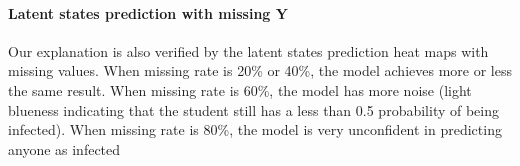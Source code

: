 \documentclass{article} %
\begin{document}
\begin{figure}[htpb]
\centering
{}
\end{figure}


\paragraph {Latent states prediction with missing Y} Our explanation is also verified by the latent states prediction heat maps with missing values. When missing rate is 20\% or 40\%, the model achieves more or less the same result. When missing rate is 60\%, the model has more noise (light blueness indicating that the student still has a less than 0.5 probability of being infected). When missing rate is 80\%, the model is very unconfident in predicting anyone as infected
\end{document}
